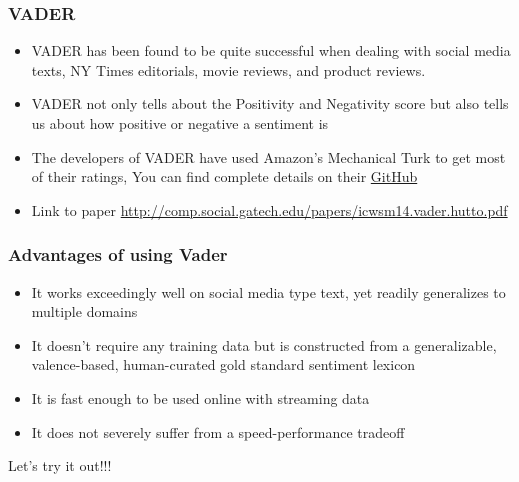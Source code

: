 \documentclass[compress, aspectratio=54]{beamer}
\begin{document}

\begin{frame}
\frametitle{VADER}
\begin{itemize}
\item VADER has been found to be quite successful when dealing with social media texts, NY Times editorials, movie reviews, and product reviews. 
\item VADER not only tells about the Positivity and Negativity score but also tells us about how positive or negative a sentiment is
\item The developers of VADER have used Amazon's Mechanical Turk to get most of their ratings, You can find complete details on their \href{https://github.com/cjhutto/vaderSentiment}{GitHub}
\item Link to paper \url{http://comp.social.gatech.edu/papers/icwsm14.vader.hutto.pdf}
\end{itemize}
\end{frame}


\begin{frame}
\frametitle{Advantages of using Vader}
\begin{itemize}
\item It works exceedingly well on social media type text, yet readily generalizes to multiple domains

\item It doesn't require any training data but is constructed from a generalizable, valence-based, human-curated gold standard sentiment lexicon
\item It is fast enough to be used online with streaming data

\item  It does not severely suffer from a speed-performance tradeoff
\end{itemize}
\end{frame}



\begin{frame}
\begin{center}
\huge{Let's try it out!!!}
\end{center}
\end{frame}
\end{document}
